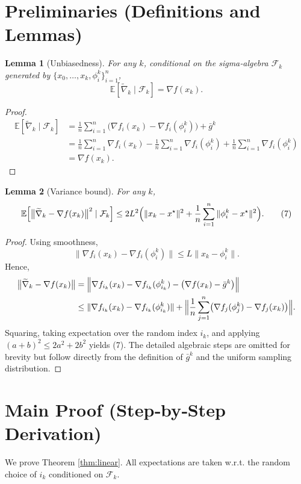 \documentclass{article}
\newtheorem{lemma}{Lemma}
\newcommand{\E}{\mathbb{E}}
\begin{document}
\section*{Preliminaries (Definitions and Lemmas)}
\begin{lemma}[Unbiasedness]\label{lem:unbiased}
For any $k$, conditional on the sigma‑algebra $\mathcal{F}_k$ generated by $\{x_0,\dots,x_k,\phi_i^{k}\}_{i=1}^{n}$,
\[
\E\!\left[\widetilde{\nabla}_k\mid\mathcal{F}_k\right]=\nabla f(x_k).
\]
\end{lemma}
\begin{proof}
\[
\begin{aligned}
\E[\widetilde{\nabla}_k\mid\mathcal{F}_k]
&=\frac1n\sum_{i=1}^{n}\bigl(\nabla f_i(x_k)-\nabla f_i(\phi_i^{k})\bigr)+\bar g^{k}\\
&=\frac1n\sum_{i=1}^{n}\nabla f_i(x_k)-\frac1n\sum_{i=1}^{n}\nabla f_i(\phi_i^{k})+\frac1n\sum_{i=1}^{n}\nabla f_i(\phi_i^{k})\\
&=\nabla f(x_k).
\end{aligned}
\]
\end{proof}

\begin{lemma}[Variance bound]\label{lem:var}
For any $k$,
\[
\E\!\left[\bigl\|\widetilde{\nabla}_k-\nabla f(x_k)\bigr\|^{2}\mid\mathcal{F}_k\right]\le
2L^{2}\Bigl(\|x_k-x^\star\|^{2}+\frac{1}{n}\sum_{i=1}^{n}\|\phi_i^{k}-x^\star\|^{2}\Bigr).
\tag{7}
\]
\end{lemma}
\begin{proof}
Using smoothness,
\[
\|\nabla f_i(x_k)-\nabla f_i(\phi_i^{k})\|\le L\|x_k-\phi_i^{k}\|.
\]
Hence,
\[
\begin{aligned}
\bigl\|\widetilde{\nabla}_k-\nabla f(x_k)\bigr\|
&=\Bigl\|\nabla f_{i_k}(x_k)-\nabla f_{i_k}(\phi_{i_k}^{k})-\bigl(\nabla f(x_k)-\bar g^{k}\bigr)\Bigr\|\\
&\le\|\nabla f_{i_k}(x_k)-\nabla f_{i_k}(\phi_{i_k}^{k})\|+\Bigl\|\frac1n\sum_{j=1}^{n}\bigl(\nabla f_j(\phi_j^{k})-\nabla f_j(x_k)\bigr)\Bigr\| .
\end{aligned}
\]
Squaring, taking expectation over the random index $i_k$, and applying $(a+b)^{2}\le2a^{2}+2b^{2}$ yields (7). The detailed algebraic steps are omitted for brevity but follow directly from the definition of $\bar g^{k}$ and the uniform sampling distribution. 
\end{proof}

\section*{Main Proof (Step‑by‑Step Derivation)}
We prove Theorem \ref{thm:linear}.  
All expectations are taken w.r.t. the random choice of $i_k$ conditioned on $\mathcal{F}_k$.
\end{document}
